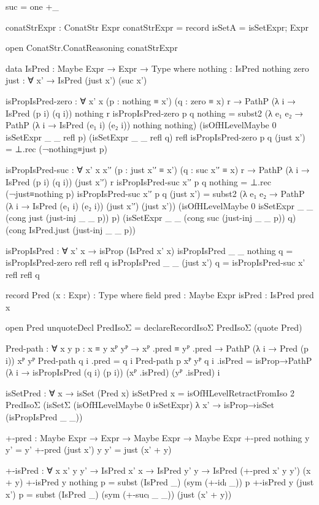 \begin{code}[hide]
  suc = one +_

  conatStrExpr : ConatStr Expr
  conatStrExpr = record{ isSetA = isSetExpr; Expr }

  open ConatStr.ConatReasoning conatStrExpr

  data IsPred : Maybe Expr → Expr → Type where
    nothing : IsPred nothing zero
    just : ∀ x' → IsPred (just x') (suc x')

  isPropIsPred-zero :
    ∀ {x' x} (p : nothing ≡ x') (q : zero ≡ x) r →
    PathP (λ i → IsPred (p i) (q i)) nothing r
  isPropIsPred-zero p q nothing =
    subst2 (λ e₁ e₂ → PathP (λ i → IsPred (e₁ i) (e₂ i)) nothing nothing)
      (isOfHLevelMaybe 0 isSetExpr _ _ refl p)
      (isSetExpr _ _ refl q)
      refl
  isPropIsPred-zero p q (just x') = ⊥.rec (¬nothing≡just p)

  isPropIsPred-suc :
    ∀ {x' x} x'′ (p : just x'′ ≡ x') (q : suc x'′ ≡ x) r →
    PathP (λ i → IsPred (p i) (q i)) (just x'′) r
  isPropIsPred-suc x'′ p q nothing = ⊥.rec (¬just≡nothing p)
  isPropIsPred-suc x'′ p q (just x') =
    subst2 (λ e₁ e₂ → PathP (λ i → IsPred (e₁ i) (e₂ i)) (just x'′) (just x'))
      (isOfHLevelMaybe 0 isSetExpr _ _ (cong just (just-inj _ _ p)) p)
      (isSetExpr _ _ (cong suc (just-inj _ _ p)) q)
      (cong IsPred.just (just-inj _ _ p))

  isPropIsPred : ∀ x' x → isProp (IsPred x' x)
  isPropIsPred _ _ nothing q = isPropIsPred-zero refl refl q
  isPropIsPred _ _ (just x') q = isPropIsPred-suc x' refl refl q

  record Pred (x : Expr) : Type where
    field
      pred : Maybe Expr
      isPred : IsPred pred x

  open Pred
  unquoteDecl PredIsoΣ = declareRecordIsoΣ PredIsoΣ (quote Pred)

  Pred-path :
    ∀ {x y} {p : x ≡ y} {xᴾ yᴾ} →
    xᴾ .pred ≡ yᴾ .pred → PathP (λ i → Pred (p i)) xᴾ yᴾ
  Pred-path q i .pred = q i
  Pred-path {p} {xᴾ} {yᴾ} q i .isPred =
    isProp→PathP (λ i → isPropIsPred (q i) (p i)) (xᴾ .isPred) (yᴾ .isPred) i

  isSetPred : ∀ x → isSet (Pred x)
  isSetPred x =
    isOfHLevelRetractFromIso 2 PredIsoΣ
      (isSetΣ (isOfHLevelMaybe 0 isSetExpr) λ x' →
        isProp→isSet (isPropIsPred _ _))

  +-pred : Maybe Expr → Expr → Maybe Expr → Maybe Expr
  +-pred nothing y y' = y'
  +-pred (just x') y y' = just (x' + y)

  +-isPred :
    ∀ {x x' y y'} →
    IsPred x' x → IsPred y' y → IsPred (+-pred x' y y') (x + y)
  +-isPred {y} nothing p = subst (IsPred _) (sym (+-idₗ _)) p
  +-isPred {y} (just x') p =
    subst (IsPred _) (sym (+-sucₗ _ _)) (just (x' + y))


\end{code}
